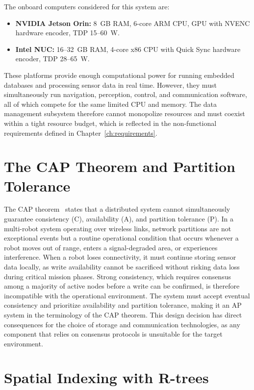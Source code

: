 The onboard computers considered for this system are:

\begin{itemize}
    \item \textbf{NVIDIA Jetson Orin:} 8~GB RAM, 6-core ARM CPU, GPU with NVENC hardware encoder, TDP 15--60~W.
    \item \textbf{Intel NUC:} 16--32~GB RAM, 4-core x86 CPU with Quick Sync hardware encoder, TDP 28--65~W.
\end{itemize}

These platforms provide enough computational power for running embedded databases and processing sensor data in real time. However, they must simultaneously run navigation, perception, control, and communication software, all of which compete for the same limited CPU and memory. The data management subsystem therefore cannot monopolize resources and must coexist within a tight resource budget, which is reflected in the non-functional requirements defined in Chapter~\ref{ch:requirements}.

\section{The CAP Theorem and Partition Tolerance} \label{sec:cap-theorem}

The CAP theorem~\cite{brewer2000cap} states that a distributed system cannot simultaneously guarantee consistency (C), availability (A), and partition tolerance (P). In a multi-robot system operating over wireless links, network partitions are not exceptional events but a routine operational condition that occurs whenever a robot moves out of range, enters a signal-degraded area, or experiences interference. When a robot loses connectivity, it must continue storing sensor data locally, as write availability cannot be sacrificed without risking data loss during critical mission phases. Strong consistency, which requires consensus among a majority of active nodes before a write can be confirmed, is therefore incompatible with the operational environment. The system must accept eventual consistency and prioritize availability and partition tolerance, making it an AP system in the terminology of the CAP theorem. This design decision has direct consequences for the choice of storage and communication technologies, as any component that relies on consensus protocols is unsuitable for the target environment.

\section{Spatial Indexing with R-trees} \label{sec:r-trees}

